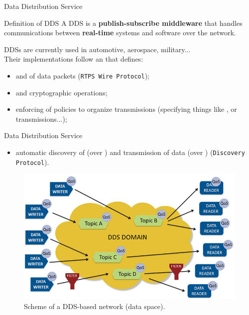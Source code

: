 \begin{frame}{Data Distribution Service}
	\begin{block}{Definition of DDS}
		A DDS is a \textbf{publish-subscribe middleware} that handles communications between \textbf{real-time} systems and software over the network.
	\end{block}
	DDSs are currently used in automotive, aerospace, military...\\
	Their implementations follow an  that defines:
	\begin{itemize}
		\item {} and  of data packets (\texttt{RTPS Wire Protocol});
		\item {} and cryptographic operations;
		\item enforcing of  policies to organize transmissions (specifying things like ,  or  transmissions...);
	\end{itemize}
\end{frame}
\begin{frame}{Data Distribution Service}
	\begin{itemize}
		\item automatic discovery of  (over ) and transmission of data (over ) (\texttt{Discovery Protocol}).
	\end{itemize}
	\begin{figure}
		\centering
		\includegraphics[scale=.32]{ddsDomain.jpg}
		\caption{Scheme of a DDS-based network (data space).}
		\label{fig:ddsdomain}
	\end{figure}
\end{frame}
